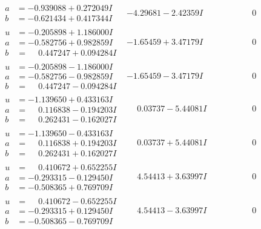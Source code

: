 \documentclass[1p]{elsarticle_modified}
\theoremstyle{definition}
\begin{document}
$$\begin{array}{c|c|c}
\begin{aligned}
a &= -0.939088 + 0.272049 I \\
b &= -0.621434 + 0.417344 I\end{aligned}
 & -4.29681 - 2.42359 I & \phantom{-0.000000 } 0 \\ \hline\begin{aligned}
u &= -0.205898 + 1.186000 I \\
a &= -0.582756 + 0.982859 I \\
b &= \phantom{-}0.447247 + 0.094284 I\end{aligned}
 & -1.65459 + 3.47179 I & \phantom{-0.000000 } 0 \\ \hline\begin{aligned}
u &= -0.205898 - 1.186000 I \\
a &= -0.582756 - 0.982859 I \\
b &= \phantom{-}0.447247 - 0.094284 I\end{aligned}
 & -1.65459 - 3.47179 I & \phantom{-0.000000 } 0 \\ \hline\begin{aligned}
u &= -1.139650 + 0.433163 I \\
a &= \phantom{-}0.116838 - 0.194203 I \\
b &= \phantom{-}0.262431 - 0.162027 I\end{aligned}
 & \phantom{-}0.03737 - 5.44081 I & \phantom{-0.000000 } 0 \\ \hline\begin{aligned}
u &= -1.139650 - 0.433163 I \\
a &= \phantom{-}0.116838 + 0.194203 I \\
b &= \phantom{-}0.262431 + 0.162027 I\end{aligned}
 & \phantom{-}0.03737 + 5.44081 I & \phantom{-0.000000 } 0 \\ \hline\begin{aligned}
u &= \phantom{-}0.410672 + 0.652255 I \\
a &= -0.293315 - 0.129450 I \\
b &= -0.508365 + 0.769709 I\end{aligned}
 & \phantom{-}4.54413 + 3.63997 I & \phantom{-0.000000 } 0 \\ \hline\begin{aligned}
u &= \phantom{-}0.410672 - 0.652255 I \\
a &= -0.293315 + 0.129450 I \\
b &= -0.508365 - 0.769709 I\end{aligned}
 & \phantom{-}4.54413 - 3.63997 I & \phantom{-0.000000 } 0 \\ \hline\begin{aligned}

\end{aligned}
\end{array}$$
\end{document}
